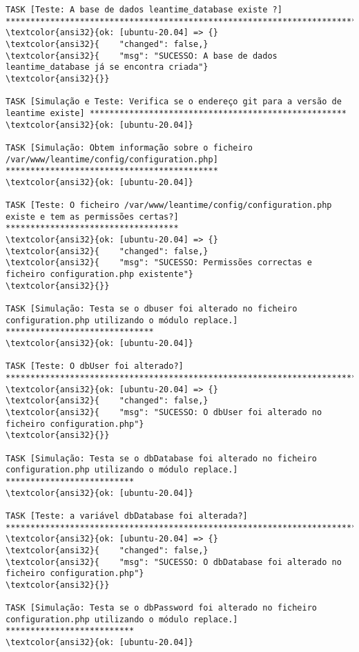 \documentclass{scrartcl}
\begin{document}
\begin{Verbatim}
TASK [Teste: A base de dados leantime_database existe ?] *********************************************************************************
\textcolor{ansi32}{ok: [ubuntu-20.04] => {}
\textcolor{ansi32}{    "changed": false,}
\textcolor{ansi32}{    "msg": "SUCESSO: A base de dados leantime_database já se encontra criada"}
\textcolor{ansi32}{}}

TASK [Simulação e Teste: Verifica se o endereço git para a versão de leantime existe] ****************************************************
\textcolor{ansi32}{ok: [ubuntu-20.04]}

TASK [Simulação: Obtem informação sobre o ficheiro /var/www/leantime/config/configuration.php] *******************************************
\textcolor{ansi32}{ok: [ubuntu-20.04]}

TASK [Teste: O ficheiro /var/www/leantime/config/configuration.php existe e tem as permissões certas?] ***********************************
\textcolor{ansi32}{ok: [ubuntu-20.04] => {}
\textcolor{ansi32}{    "changed": false,}
\textcolor{ansi32}{    "msg": "SUCESSO: Permissões correctas e ficheiro configuration.php existente"}
\textcolor{ansi32}{}}

TASK [Simulação: Testa se o dbuser foi alterado no ficheiro configuration.php utilizando o módulo replace.] ******************************
\textcolor{ansi32}{ok: [ubuntu-20.04]}

TASK [Teste: O dbUser foi alterado?] *****************************************************************************************************
\textcolor{ansi32}{ok: [ubuntu-20.04] => {}
\textcolor{ansi32}{    "changed": false,}
\textcolor{ansi32}{    "msg": "SUCESSO: O dbUser foi alterado no ficheiro configuration.php"}
\textcolor{ansi32}{}}

TASK [Simulação: Testa se o dbDatabase foi alterado no ficheiro configuration.php utilizando o módulo replace.] **************************
\textcolor{ansi32}{ok: [ubuntu-20.04]}

TASK [Teste: a variável dbDatabase foi alterada?] ****************************************************************************************
\textcolor{ansi32}{ok: [ubuntu-20.04] => {}
\textcolor{ansi32}{    "changed": false,}
\textcolor{ansi32}{    "msg": "SUCESSO: O dbDatabase foi alterado no ficheiro configuration.php"}
\textcolor{ansi32}{}}

TASK [Simulação: Testa se o dbPassword foi alterado no ficheiro configuration.php utilizando o módulo replace.] **************************
\textcolor{ansi32}{ok: [ubuntu-20.04]}


\end{Verbatim}
\end{document}
